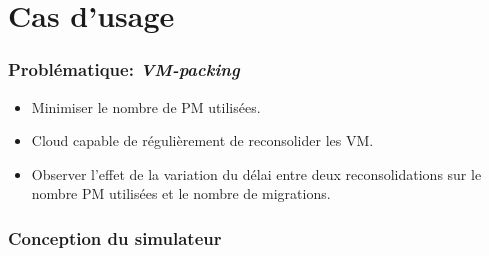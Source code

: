 \documentclass{beamer}
\begin{document}

\section{Cas d'usage}

\begin{frame}
	\frametitle{Problématique: \emph{VM-packing}}
	\begin{itemize}
		\item Minimiser le nombre de PM utilisées.
		\item Cloud capable de régulièrement de reconsolider les VM.
		\item Observer l'effet de la variation du délai entre
			deux reconsolidations sur le nombre PM utilisées et le
			nombre de migrations.
	\end{itemize}
\end{frame}

\begin{frame}
	\frametitle{Conception du simulateur}
	\resizebox{\textwidth}{!}{}	
\end{frame}

\end{document}
